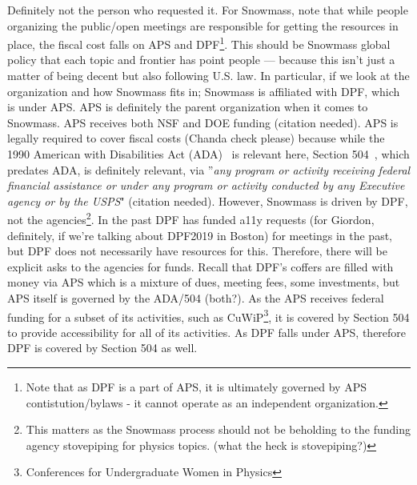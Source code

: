 \documentclass{article}
\begin{document}
  Definitely not the person who requested it. For Snowmass, note that while people organizing the public/open meetings are responsible for getting the resources in place, the fiscal cost falls on APS and DPF\footnote{Note that as DPF is a part of APS, it is ultimately governed by APS contistution/bylaws - it cannot operate as an independent organization.}. This should be Snowmass global policy that each topic and frontier has point people — because this isn’t just a matter of being decent but also following U.S. law. In particular, if we look at the organization and how Snowmass fits in; Snowmass is affiliated with DPF, which is under APS. APS is definitely the parent organization when it comes to Snowmass. APS receives both NSF and DOE funding (citation needed). APS is legally required to cover fiscal costs (Chanda check please) because while the 1990 American with Disabilities Act (ADA)~\cite{ADA1991} is relevant here, Section 504~\cite{504}, which predates ADA, is definitely relevant, via ''\textsl{any program or activity receiving federal financial assistance or under any program or activity conducted by any Executive agency or by the USPS}" (citation needed). However, Snowmass is driven by DPF, not the agencies\footnote{This matters as the Snowmass process should not be beholding to the funding agency stovepiping for physics topics. (what the heck is stovepiping?)}. In the past DPF has funded a11y requests (for Giordon, definitely, if we're talking about DPF2019 in Boston) for meetings in the past, but DPF does not necessarily have resources for this. Therefore, there will be explicit asks to the agencies for funds. Recall that DPF's coffers are filled with money via APS which is a mixture of dues, meeting fees, some investments, but APS itself is governed by the ADA/504 (both?). As the APS receives federal funding for a subset of its activities, such as CuWiP\footnote{Conferences for Undergraduate Women in Physics}, it is covered by Section 504 to provide accessibility for all of its activities. As DPF falls under APS, therefore DPF is covered by Section 504 as well.
\end{document}
